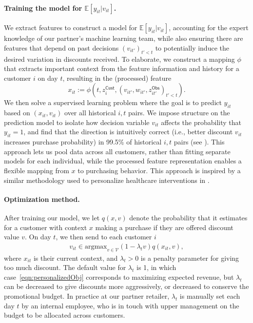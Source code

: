 \documentclass[format=acmsmall, review=false]{acmart}
\newcommand{\argmax}{\mathrm{argmax}}
\newcommand{\bE}{\mathbb{E}}
\newcommand{\cV}{\mathcal{V}}
\newcommand{\zCust}{z^\mathsf{Cust}}
\newcommand{\zObs}{z^\mathsf{Obs}}
\begin{document}
\paragraph{Training the model for $\bE[y_{it}|v_{it}]$.}
We extract features to construct a model for $\bE[y_{it}|v_{it}]$, accounting for the expert knowledge of our partner's machine learning team, while also ensuring there are features that depend on past decisions $(v_{it'})_{t'<t}$ to potentially induce the desired variation in discounts received.  To elaborate, we construct a mapping $\phi$ that extracts important context from the feature information and history for a customer $i$ on day $t$, resulting in the (processed) feature
$$
x_{it}:=\phi(t,\zCust_i,(v_{it'},w_{it'},\zObs_{it'})_{t'<t}).
$$
We then solve a supervised learning problem where the goal is to predict $y_{it}$ based on $(x_{it},v_{it})$ over all historical $i,t$ pairs.
We impose structure on the prediction model to isolate how decision variable $v_{it}$ affects the probability that $y_{it}=1$, and find that the direction is intuitively correct (i.e., better discount $v_{it}$ increases purchase probability) in 99.5\% of historical $i,t$ pairs (see \textbf{}).
This approach lets us pool data across all customers, rather than fitting separate models for each individual, while the processed feature representation enables a flexible mapping from $x$ to purchasing behavior. This approach is inspired by a similar methodology used to personalize healthcare interventions in \citet{baek2025policy}.


\paragraph{Optimization method.}
After training our model, we let $q(x,v)$ denote the probability that it estimates for a customer with context $x$ making a purchase if they are offered discount value $v$.  On day $t$, we then send to each customer $i$
\begin{align} \label{eqn:personalizedObj}
v_{it}\in\argmax_{v\in\cV}(1-\lambda_t v)q(x_{it},v),
\end{align}
where $x_{it}$ is their current context, and $\lambda_t>0$ is a penalty parameter for giving too much discount.
The default value for $\lambda_t$ is 1, in which case~\eqref{eqn:personalizedObj} corresponds to maximizing expected revenue, but $\lambda_t$ can be decreased to give discounts more aggressively, or decreased to conserve the promotional budget.
In practice at our partner retailer, $\lambda_t$ is manually set each day $t$ by an internal employee, who is in touch with upper management on the budget to be allocated across customers.
\end{document}
